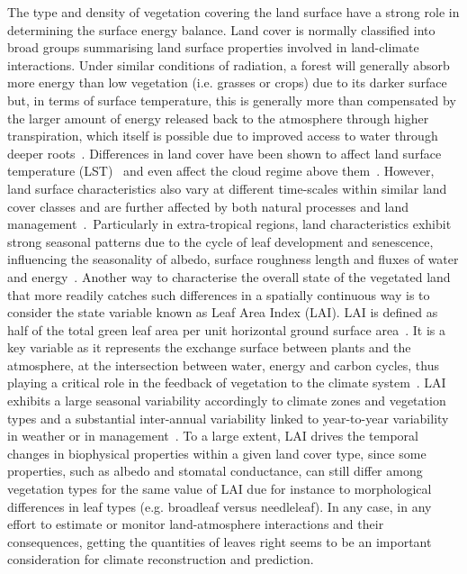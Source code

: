 \documentclass[gmd, manuscript]{copernicus}
\begin{document}
The type and density of vegetation covering the land surface have a
strong role in determining the surface energy balance. Land cover is
normally classified into broad groups summarising land surface
properties involved in land-climate interactions. Under similar
conditions of radiation, a forest will generally absorb more energy than
low vegetation (i.e. grasses or crops) due to its darker surface but, in
terms of surface temperature, this is generally more than compensated by
the larger amount of energy released back to the atmosphere through
higher transpiration, which itself is possible due to improved access to
water through deeper roots~\citep{Bonan2008}. Differences in land cover
have been shown to affect land surface temperature
(LST)~\citep{Duveiller_2018, Alkama2016, Li2015} and even affect the cloud regime above
them~\citep{Duveiller_2021, Xu2022}. However, land surface characteristics also vary
at different time-scales within similar land cover classes and are
further affected by both natural processes and land
management~\citep{anderson2011biophysical}.~Particularly in extra-tropical regions,
land characteristics exhibit strong seasonal patterns due to the cycle
of leaf development and senescence, influencing the seasonality of
albedo, surface roughness length and fluxes of water
and energy~\citep{RICHARDSON2013156}. Another way to characterise the overall
state of the vegetated land that more readily catches such differences
in a spatially continuous way is to consider the state variable known as
Leaf Area Index (LAI). LAI is defined as half of the total green leaf area
per unit horizontal ground surface area~\citep{yan2019review}. It is a key
variable as it represents the exchange surface between plants and the
atmosphere, at the intersection between water, energy and carbon cycles,
thus playing a critical role in the feedback of vegetation to the
climate system~\citep{fang2019overview, Forzieri_2017}. LAI exhibits a large seasonal
variability accordingly to climate zones and vegetation types and a
substantial inter-annual variability linked to year-to-year variability
in weather or in management~\citep{boussetta2015assimilation}. To a large extent,
LAI drives the temporal changes in biophysical properties within a given
land cover type, since some properties, such as albedo and stomatal
conductance, can still differ among vegetation types for the same value
of LAI due for instance to morphological differences in leaf types (e.g.
broadleaf versus needleleaf). In any case, in any effort to estimate or
monitor land-atmosphere interactions and their consequences, getting the
quantities of leaves right seems to be an important consideration for
climate reconstruction and prediction.~
\end{document}
